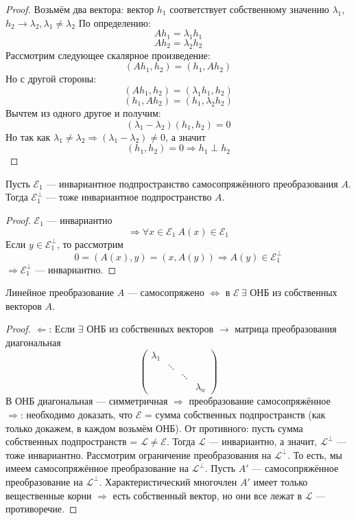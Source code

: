 \documentclass[11pt]{article}
\begin{document}
\begin{proof}
    Возьмём два вектора: вектор $h_1$ соответствует собственному значению $\lambda_1$,\\
    $h_2\to \lambda_2, \lambda_1\neq \lambda_2$
    По определению: 
    \[ Ah_1 = \lambda_1 h_1 \]
    \[ Ah_2 = \lambda_2 h_2 \]
    Рассмотрим следующее скалярное произведение: 
    \[ (Ah_1,h_2) = (h_1,Ah_2) \]   
    Но с другой стороны:
    \[ (Ah_1,h_2) = (\lambda_1h_1, h_2) \] 
    \[ (h_1,Ah_2) = (h_1, \lambda_2h_2) \]
    Вычтем из одного другое и получим:
    \[ (\lambda_1 - \lambda_2) (h_1,h_2) = 0 \]
    Но так как $\lambda_1\neq \lambda_2 \Rightarrow (\lambda_1 - \lambda_2) \neq 0$, а значит
    \[ (h_1,h_2) = 0 \Rightarrow h_1\perp h_2 \]
\end{proof}

\begin{theorem}
    Пусть $\mathcal{E}_1$ --- инвариантное подпространство самосопряжённого преобразования $A$. Тогда
    $\mathcal{E}_1^\perp$ --- тоже инвариантное подпространство $A$. 
\end{theorem}

\begin{proof}
    $\mathcal{E}_1$ --- инвариантно 
    \[ \Rightarrow \forall x\in \mathcal{E}_1 \ A(x)\in \mathcal{E}_1 \]
    Если $ y\in \mathcal{E}_1^\perp$, то рассмотрим
    \[ 0 = (A(x),y) = (x, A(y)) \Rightarrow A(y)\in \mathcal{E}_1^\perp \]   
    $\Rightarrow \mathcal{E}_1^\perp$ --- инвариантно.
\end{proof}


\begin{theorem}
    Линейное преобразование $A$ --- самосопряжено $\Leftrightarrow$ в $\mathcal{E} \ \exists$ ОНБ из собственных векторов $A$.  
\end{theorem}

\begin{proof}
    $\Leftarrow$:  Если $\exists$ ОНБ из собственных векторов $\to$ матрица преобразования диагональная 
    \[ \begin{pmatrix}
        \lambda_1 &        &        &   \\
        & \ddots &        &   \\
        &        & \ddots &   \\
        &        &        & \lambda_n
    \end{pmatrix} \]
    В ОНБ диагональная --- симметричная $\Rightarrow$ преобразование самосопряжённое \\
    $\Rightarrow$: необходимо доказать, что $\mathcal{E}$ = сумма собственных подпространств (как только докажем, в каждом возьмём ОНБ). От противного: пусть сумма собственных подпространств = $\mathcal{L} \neq \mathcal{E}$.
    Тогда $\mathcal{L}$ --- инвариантно, а значит, $\mathcal{L}^\perp$ --- тоже инвариантно. Рассмотрим ограничение преобразования на $\mathcal{L}^\perp$.
    То есть, мы имеем самосопряжённое преобразование на $\mathcal{L}^\perp$. Пусть $A'$ --- самосопряжённое преобразование на $\mathcal{L}^\perp$. Характеристический многочлен $A'$ имеет только вещественные корни
    $\Rightarrow$ есть собственный вектор, но они все лежат в $\mathcal{L}$ --- противоречие. 
\end{proof}
\end{document}
